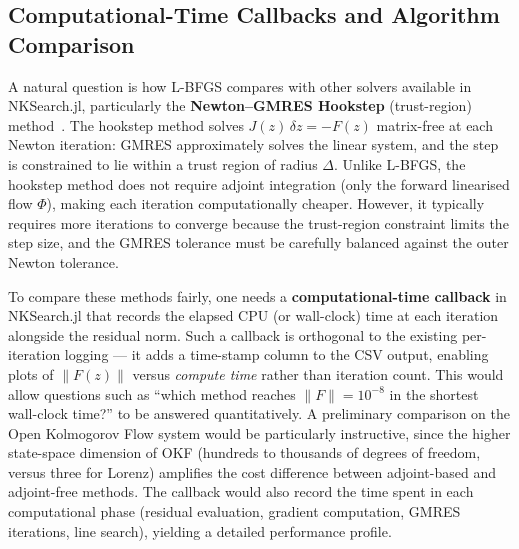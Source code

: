\documentclass[11pt,a4paper]{article}
\begin{document}
\subsection{Computational-Time Callbacks and Algorithm Comparison}
A natural question is how L-BFGS compares with other solvers available in
NKSearch.jl, particularly the \textbf{Newton--GMRES Hookstep}
(trust-region) method~\cite{sanchez2004newton}.  The hookstep method solves
$J(z)\,\delta z = -F(z)$ matrix-free at each Newton iteration: GMRES
approximately solves the linear system, and the step is constrained to lie
within a trust region of radius $\Delta$.  Unlike L-BFGS, the hookstep
method does not require adjoint integration (only the forward linearised
flow $\Phi$), making each iteration computationally cheaper.  However, it
typically requires more iterations to converge because the trust-region
constraint limits the step size, and the GMRES tolerance must be carefully
balanced against the outer Newton tolerance.

To compare these methods fairly, one needs a \textbf{computational-time
callback} in NKSearch.jl that records the elapsed CPU (or wall-clock) time
at each iteration alongside the residual norm.  Such a callback is
orthogonal to the existing per-iteration logging --- it adds a time-stamp
column to the CSV output, enabling plots of $\|F(z)\|$ versus
\textit{compute time} rather than iteration count.  This would allow
questions such as ``which method reaches $\|F\| = 10^{-8}$ in the shortest
wall-clock time?'' to be answered quantitatively.  A preliminary comparison
on the Open Kolmogorov Flow system would be particularly instructive, since
the higher state-space dimension of OKF (hundreds to thousands of degrees of
freedom, versus three for Lorenz) amplifies the cost difference between
adjoint-based and adjoint-free methods.  The callback would also record the
time spent in each computational phase (residual evaluation, gradient
computation, GMRES iterations, line search), yielding a detailed performance
profile.
\end{document}
